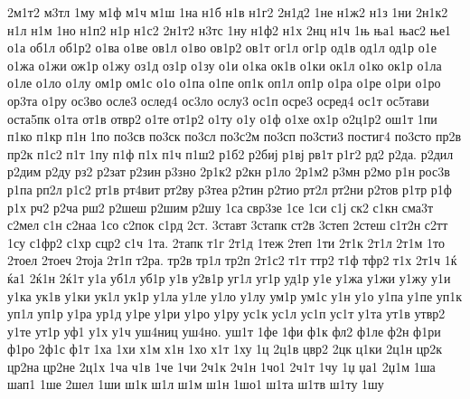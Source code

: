 {2м1т2
м3тл
1му
м1ф
м1ч
м1ш
1на
н1б
н1в
н1г2
2н1д2
1не
н1ж2
н1з
1ни
2н1к2
н1л
н1м
1но
н1п2
н1р
н1с2
2н1т2
н3тс
1ну
н1ф2
н1х
2нц
н1ч
1њ
ња1
њас2
ње1
о1а
об1л
об1р2
о1ва
о1ве
ов1л
о1во
ов1р2
ов1т
ог1л
ог1р
од1в
од1л
од1р
о1е
о1жа
о1жи
ож1р
о1жу
оз1д
оз1р
о1зу
о1и
о1ка
ок1в
о1ки
ок1л
о1ко
ок1р
о1ла
о1ле
о1ло
о1лу
ом1р
ом1с
о1о
о1па
о1пе
оп1к
оп1л
оп1р
о1ра
о1ре
о1ри
о1ро
ор3та
о1ру
ос3во
осле3
ослед4
ос3ло
ослу3
ос1п
осре3
осред4
ос1т
ос5тави
оста5пк
о1та
от1в
отвр2
о1те
от1р2
о1ту
о1у
о1ф
о1хе
ох1р
о2ц1р2
ош1т
1пи
п1ко
п1кр
п1н
1по
по3св
по3ск
по3сл
по3с2м
по3сп
по3сти3
постиг4
по3сто
пр2в
пр2к
п1с2
п1т
1пу
п1ф
п1х
п1ч
п1ш2
р1б2
р2биј
р1вј
рв1т
р1г2
рд2
р2да.
р2дил
р2дим
р2ду
рз2
р2зат
р2зин
р3зно
2р1к2
р2кн
р1ло
2р1м2
р3мн
р2мо
р1н
рос3в
р1па
рп2л
р1с2
рт1в
рт4вит
рт2ву
р3теа
р2тин
р2тио
рт2л
рт2ни
р2тов
р1тр
р1ф
р1х
рч2
р2ча
рш2
р2шеш
р2шим
р2шу
1са
свр3зе
1се
1си
с1ј
ск2
с1кн
сма3т
с2мел
с1н
с2наа
1со
с2пок
с1рд
2ст.
3ставт
3стапк
ст2в
3степ
2стеш
с1т2н
с2тт
1су
с1фр2
с1хр
сцр2
с1ч
1та.
2тапк
т1г
2т1д
1теж
2теп
1ти
2т1к
2т1л
2т1м
1то
2тоел
2тоеч
2тоја
2т1п
т2ра.
тр2в
тр1л
тр2п
2т1с2
т1т
ттр2
т1ф
тфр2
т1х
2т1ч
1ќ
ќа1
2ќ1н
2ќ1т
у1а
уб1л
уб1р
у1в
у2в1р
уг1л
уг1р
уд1р
у1е
у1жа
у1жи
у1жу
у1и
у1ка
ук1в
у1ки
ук1л
ук1р
у1ла
у1ле
у1ло
у1лу
ум1р
ум1с
у1н
у1о
у1па
у1пе
уп1к
уп1л
уп1р
у1ра
ур1д
у1ре
у1ри
у1ро
у1ру
ус1к
ус1л
ус1п
ус1т
у1та
ут1в
утвр2
у1те
ут1р
уф1
у1х
у1ч
уш4ниц
уш4но.
уш1т
1фе
1фи
ф1к
фл2
ф1ле
ф2н
ф1ри
ф1ро
2ф1с
ф1т
1ха
1хи
х1м
х1н
1хо
х1т
1ху
1ц
2ц1в
цвр2
2цк
ц1ки
2ц1н
цр2к
цр2на
цр2не
2ц1х
1ча
ч1в
1че
1чи
2ч1к
2ч1н
1чо1
2ч1т
1чу
1џ
џа1
2џ1м
1ша
шап1
1ше
2шел
1ши
ш1к
ш1л
ш1м
ш1н
1шо1
ш1та
ш1тв
ш1ту
1шу
}
